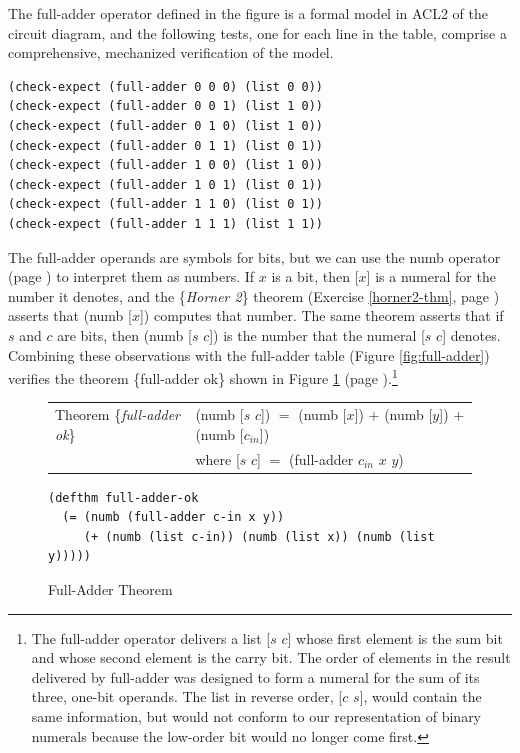 The \textsf{full-adder} operator defined in the figure
is a formal model in ACL2 of the circuit diagram,
and the following tests, one for each line in the table,
comprise a comprehensive, mechanized verification of
the model.

\label{full-adder-model-check}
\begin{Verbatim}
(check-expect (full-adder 0 0 0) (list 0 0))
(check-expect (full-adder 0 0 1) (list 1 0))
(check-expect (full-adder 0 1 0) (list 1 0))
(check-expect (full-adder 0 1 1) (list 0 1))
(check-expect (full-adder 1 0 0) (list 1 0))
(check-expect (full-adder 1 0 1) (list 0 1))
(check-expect (full-adder 1 1 0) (list 0 1))
(check-expect (full-adder 1 1 1) (list 1 1))
\end{Verbatim}

The \textsf{full-adder} operands
are symbols for bits, but we can use the \textsf{numb} operator
(page \pageref{nmb-defun})
to interpret them as numbers.
If $x$ is a bit, then \textsf{[$x$]} is a numeral for
the number it denotes, and the \{\emph{Horner 2}\} theorem
(Exercise \ref{horner2-thm}, page \pageref{horner2-thm})
asserts that \textsf{(numb [$x$])} computes that number.
The same theorem asserts that if $s$ and $c$ are bits,
then \textsf{(numb [$s$ $c$])} is 
the number that the numeral \textsf{[$s$ $c$]} denotes.
Combining these observations with the full-adder table
(Figure \ref{fig:full-adder})
verifies the theorem \{full-adder ok\} shown in
Figure \ref{fig:full-adder-thm} (page \pageref{fig:full-adder-thm}).\footnote{The
\textsf{full-adder} operator delivers a list \textsf{[$s$ $c$]} whose first
element is the sum bit and whose second element is the carry bit.
The order of elements in the result delivered by \textsf{full-adder} was designed
to form a numeral for the sum of its three, one-bit operands.
The list in reverse order, \textsf{[$c$ $s$]}, 
would contain the same information,
but would not conform to our representation of binary numerals
because the low-order bit would no longer come first.}

\begin{figure}
\begin{center}
\begin{tabular}{ll}
Theorem \{\emph{full-adder ok}\} & \textsf{(numb [$s$ $c$])} $=$ \textsf{(numb [$x$])} $+$ \textsf{(numb [$y$])} $+$ \textsf{(numb [$c_{in}$])} \\
                                 & where \textsf{[$s$ $c$]} $=$ \textsf{(full-adder $c_{in}$ $x$ $y$)} \\
\end{tabular}
\begin{Verbatim}
(defthm full-adder-ok
  (= (numb (full-adder c-in x y))
     (+ (numb (list c-in)) (numb (list x)) (numb (list y)))))
\end{Verbatim}
\end{center}
\caption{Full-Adder Theorem}
\label{fig:full-adder-thm}
\end{figure}

